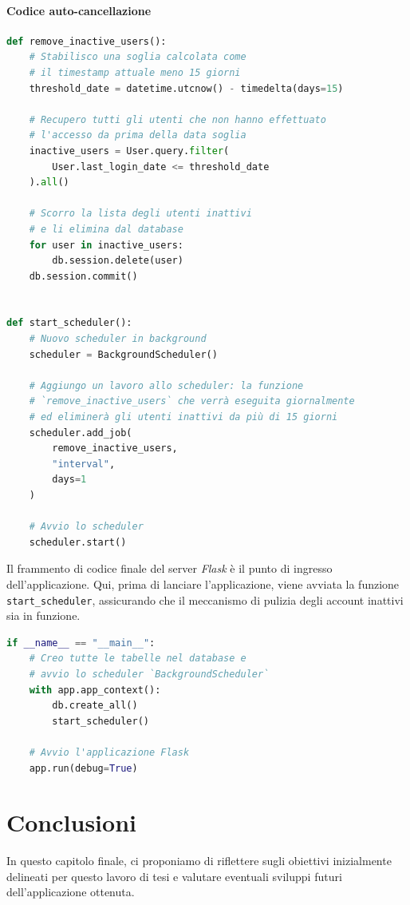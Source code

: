 \documentclass[12pt]{report}
\newcommand{\flask}{\textsl{Flask}\xspace}
\begin{document}
\subsubsection{Codice auto-cancellazione}
\begin{lstlisting}[language=Python]
def remove_inactive_users():
    # Stabilisco una soglia calcolata come
    # il timestamp attuale meno 15 giorni
    threshold_date = datetime.utcnow() - timedelta(days=15)

    # Recupero tutti gli utenti che non hanno effettuato
    # l'accesso da prima della data soglia
    inactive_users = User.query.filter(
        User.last_login_date <= threshold_date
    ).all()

    # Scorro la lista degli utenti inattivi
    # e li elimina dal database
    for user in inactive_users:
        db.session.delete(user)
    db.session.commit()


def start_scheduler():
    # Nuovo scheduler in background
    scheduler = BackgroundScheduler()

    # Aggiungo un lavoro allo scheduler: la funzione
    # `remove_inactive_users` che verrà eseguita giornalmente
    # ed eliminerà gli utenti inattivi da più di 15 giorni
    scheduler.add_job(
        remove_inactive_users,
        "interval",
        days=1
    )

    # Avvio lo scheduler
    scheduler.start()
\end{lstlisting}


\newpage
\begin{mdframed}
\small
Il frammento di codice finale del server \flask è il punto di ingresso dell'applicazione. Qui, prima di lanciare l'applicazione, viene avviata la funzione \texttt{start\_scheduler}, assicurando che il meccanismo di pulizia degli account inattivi sia in funzione.

\begin{lstlisting}[language=Python]
if __name__ == "__main__":
    # Creo tutte le tabelle nel database e
    # avvio lo scheduler `BackgroundScheduler`
    with app.app_context():
        db.create_all()
        start_scheduler()

    # Avvio l'applicazione Flask
    app.run(debug=True)
\end{lstlisting}
\end{mdframed}




\chapter{Conclusioni}
\label{ch:conclusioni}
In questo capitolo finale, ci proponiamo di riflettere sugli obiettivi inizialmente delineati per questo lavoro di tesi e valutare eventuali sviluppi futuri dell'applicazione ottenuta.
\end{document}
